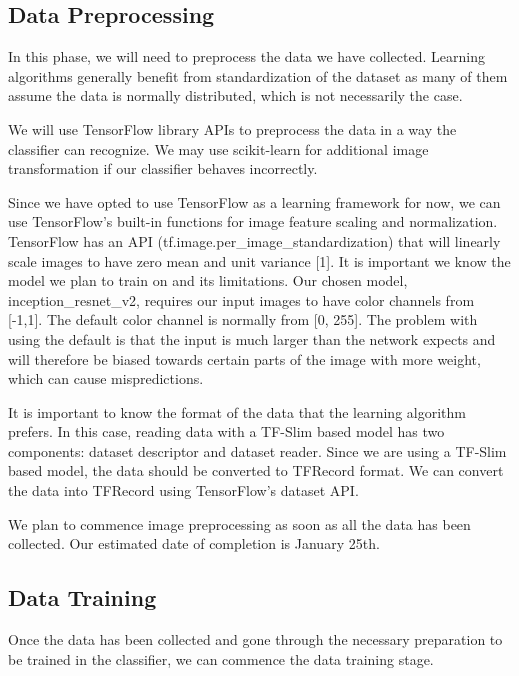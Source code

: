 \documentclass[onecolumn, draftclsnofoot,10pt, compsoc]{IEEEtran}
\begin{document}
\subsection{Data Preprocessing}

In this phase, we will need to preprocess the data we have collected. Learning algorithms generally benefit from standardization of the dataset as many of them assume the data is normally distributed, which is not necessarily the case.

We will use TensorFlow library APIs to preprocess the data in a way the classifier can recognize. We may use scikit-learn for additional image transformation if our classifier behaves incorrectly.


Since we have opted to use TensorFlow as a learning framework for now, we can use TensorFlow's built-in functions for image feature scaling and normalization. TensorFlow has an API (tf.image.per\_image\_standardization) that will linearly scale images to have zero mean and unit variance [1]. It is important we know the model we plan to train on and its limitations. Our chosen model, inception\_resnet\_v2, requires our input images to have color channels from [-1,1]. The default color channel is normally from [0, 255]. The problem with using the default is that the input is much larger than the network expects and will therefore be biased towards certain parts of the image with more weight, which can cause mispredictions. 

It is important to know the format of the data that the learning algorithm prefers. In this case, reading data with a TF-Slim based model has two components: dataset descriptor and dataset reader. Since we are using a TF-Slim based model, the data should be converted to TFRecord format. We can convert the data into TFRecord using TensorFlow's dataset API. 

We plan to commence image preprocessing as soon as all the data has been collected. Our estimated date of completion is January 25th. 

\subsection{Data Training}

Once the data has been collected and gone through the necessary preparation to be trained in the classifier, we can commence the data training stage. 
\end{document}
